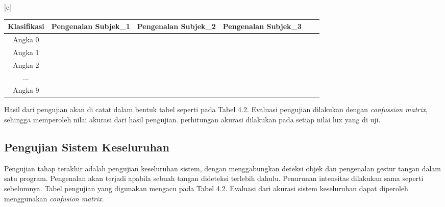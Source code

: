 \begin{table}[H]
\begin{tabular}{|c|}
	\\
	\begin{tabular}{|c|c|c|c|c|c|c|c|c|c|c|c|c|c|c|c|c|c|c|c|c|c|c|c|c|c|c|c|c|c|c|c|c|}
		\hline
		Klasifikasi & \multicolumn{10}{|c|}{Pengenalan Subjek\_1}& \multicolumn{10}{|c|}{Pengenalan Subjek\_2}& \multicolumn{10}{|c|}{Pengenalan Subjek\_3}\\
		\hline Angka 0 & & & &&&&&&&&&&&&&&&&&&&&&&&&&&&\\
		\hline Angka 1 & & & &&&&&&&&&&&&&&&&&&&&&&&&&&&\\	
		\hline Angka 2 & & & &&&&&&&&&&&&&&&&&&&&&&&&&&&\\
		\hline ... & & & &&&&&&&&&&&&&&&&&&&&&&&&&&& \\
		\hline Angka 9 & & & &&&&&&&&&&&&&&&&&&&&&&&&&&& \\
		\hline
	\end{tabular}
\end{tabular}
\end{table}
Hasil dari pengujian akan di catat dalam bentuk tabel seperti pada Tabel 4.2.
Evaluasi pengujian dilakukan dengan \emph{confussion matrix}, sehingga memperoleh nilai akurasi dari hasil pengujian. perhitungan akurasi dilakukan pada setiap nilai lux yang di uji.

\subsection{Pengujian Sistem Keseluruhan}
Pengujian tahap terakhir adalah pengujian keseluruhan sistem, dengan menggabungkan deteksi objek dan pengenalan gestur tangan dalam satu program. Pengenalan akan terjadi apabila sebuah tangan dideteksi terlebih dahulu. Penurunan intensitas dilakukan sama seperti sebelumnya. Tabel pengujian yang digunakan mengacu pada Tabel 4.2. Evaluasi dari akurasi sistem keseluruhan dapat diperoleh menggunakan \emph{confusion matrix}.